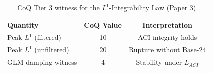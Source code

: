 \begin{table}[h]
\centering
\begin{tabular}{lcc}
\hline
\textbf{Quantity} & \textbf{CoQ Value} & \textbf{Interpretation} \\
\hline
Peak $L^1$ (filtered) & 10 & ACI integrity holds \\
Peak $L^1$ (unfiltered) & 20 & Rupture without Base-24 \\
GLM damping witness & 4 & Stability under $L_{ACI}$ \\
\hline
\end{tabular}
\caption{CoQ Tier 3 witness for the $L^1$-Integrability Law (Paper 3)}
\label{tab:coq_l1_witness}
\end{table}
